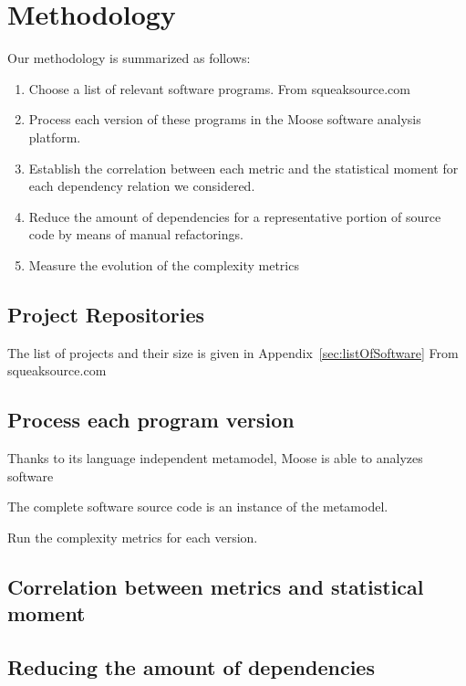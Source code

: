 \documentclass{sig-alternate}
\newcommand{\seclabel}[1]{\label{sec:#1}}
\newcommand{\appref}[1]{Appendix~\ref{sec:#1}}
\begin{document}
\section{Methodology}\seclabel{methodology}

Our methodology is summarized as follows:

\begin{enumerate}
\item Choose a list of relevant software programs. From squeaksource.com
\item Process each version of these programs in the Moose software analysis platform. 
\item Establish the correlation between each metric and the statistical moment for each dependency relation we considered.
\item Reduce the amount of dependencies for a representative portion of source code by means of manual refactorings.
\item Measure the evolution of the complexity metrics
\end{enumerate}

\subsection{Project Repositories}

The list of projects and their size is given in \appref{listOfSoftware}
From squeaksource.com


\subsection{Process each program version}

Thanks to its language independent metamodel, Moose is able to analyzes software

The complete software source code is an instance of the metamodel.

Run the complexity metrics for each version.

\subsection{Correlation between metrics and statistical moment}



\subsection{Reducing the amount of dependencies}
\end{document}
